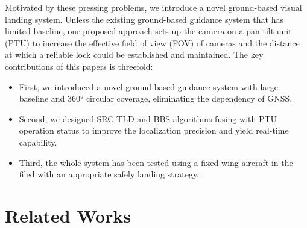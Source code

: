 Motivated by these pressing problems, we introduce a novel ground-based visual landing system. Unless the existing ground-based guidance system that has limited baseline, our proposed approach sets up the camera on a pan-tilt unit (PTU) to increase the effective field of view (FOV) of cameras and the distance at which a reliable lock could be established and maintained. The key contributions of this papers is threefold:
\begin{itemize}
	\item First, we introduced a novel ground-based guidance system with large baseline and 360° circular coverage, eliminating the dependency of GNSS.
	\item Second, we designed SRC-TLD and BBS algorithms fusing with PTU operation status to improve the localization precision and yield real-time capability.
	\item Third, the whole system has been tested using a fixed-wing aircraft in the filed with an appropriate safely landing strategy.
\end{itemize}



\section{Related Works}

%
%

